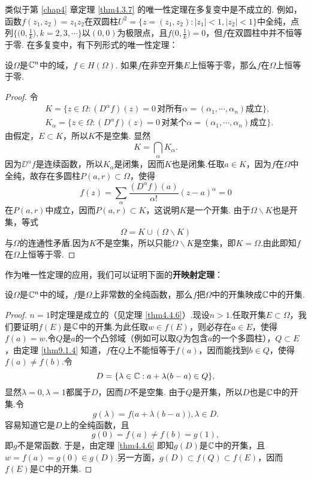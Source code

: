 类似于第 \ref{chap4} 章定理 \ref{thm4.3.7} 的唯一性定理在多复变中是不成立的. 例如，函数$f(z_1,z_2)=z_1z_2$在双圆柱$U^2=\{z=(z_1,z_2):|z_1|<1,|z_2|<1\}$中全纯，点列$\bigg\{\bigg(0,\frac1k\bigg),k=2,3,\cdots\bigg\}$以$(0,0)$为极限点，且$f\bigg(0,\frac1k\bigg)=0$，但$f$在双圆柱中并不恒等于零. 在多复变中，有下列形式的唯一性定理：
\begin{theorem}\label{thm9.1.4}
  设$\Omega$是$\mathbb C^n$中的域，$f\in H(\Omega)$. 如果$f$在非空开集$E$上恒等于零，那么$f$在$\Omega$上恒等于零.
\end{theorem}
\begin{proof}
  令
  \begin{align*}
    & K = \{z\in\Omega:(D^\alpha f)(z)=0\,\mbox{对所有$\alpha=(\alpha_1,\cdots,\alpha_n)$成立}\},\\
    & K_\alpha = \{z\in\Omega:(D^\alpha f)(z)=0\,\mbox{对某个$\alpha=(\alpha_1,\cdots,\alpha_n)$成立}\}.
  \end{align*}
  由假定，$E\subset K$，所以$K$不是空集. 显然
  \[
    K = \bigcap_\alpha K_\alpha.
  \]
  因为$\DD^\alpha f$是连续函数，所以$K_\alpha$是闭集，因而$K$也是闭集.任取$a\in K$，因为$f$在$\Omega$中全纯，故存在多圆柱$P(a,r)\subset \Omega$，使得
  \[
    f(z) = \sum_\alpha\frac{(D^\alpha f)(a)}{\alpha!}(z-a)^\alpha = 0
  \]
  在$P(a,r)$中成立，因而$P(a,r)\subset K$，这说明$K$是一个开集. 由于$\Omega\backslash K$也是开集，等式
  \[
    \Omega = K\cup(\Omega\backslash K)
  \]
  与$\Omega$的连通性矛盾.因为$K$不是空集，所以只能$\Omega\backslash K$是空集，即$K=\Omega$.由此即知$f$在$\Omega$上恒等于零.
\end{proof}

作为唯一性定理的应用，我们可以证明下面的\textbf{开映射定理}：
\begin{theorem}\label{thm9.1.5}
  设$\Omega$是$\mathbb C^n$中的域，$f$是$\Omega$上非常数的全纯函数，那么$f$把$\Omega$中的开集映成$\mathbb C$中的开集.
\end{theorem}
\begin{proof}
  $n=1$时定理是成立的（见定理 \ref{thm4.4.6}）.现设$n>1$.任取开集$E\subset\Omega$，我们要证明$f(E)$是$\mathbb C$中的开集.为此任取$w\in f(E)$，则必存在$a\in E$，使得$f(a)=w$.令$Q$是$a$的一个凸邻域（例如可以取$Q$为包含$a$的一个多圆柱），$Q\subset E$，由定理 \ref{thm9.1.4} 知道，$f$在$Q$上不能恒等于$f(a)$，因而能找到$b\in Q$，使得$f(a)\ne f(b)$.令
  \[
    D = \{\lambda\in\mathbb C:a+\lambda(b-a)\in Q\},
  \]
  显然$\lambda=0,\lambda=1$都属于$D$，因而$D$不是空集. 由于$Q$是开集，所以$D$也是$\mathbb C$中的开集.令
  \[
    g(\lambda) = f\big(a+\lambda(b-a)\big),\lambda\in D.
  \]
  容易知道它是$D$上的全纯函数，且
  \[
    g(0) = f(a)\ne f(b) = g(1),
  \]
  即$g$不是常函数. 于是，由定理 \ref{thm4.4.6} 即知$g(D)$是$\mathbb C$中的开集，且$w=f(a)=g(0)\in g(D)$.另一方面，$g(D)\subset f(Q)\subset f(E)$，因而$f(E)$是$\mathbb C$中的开集.
\end{proof}

